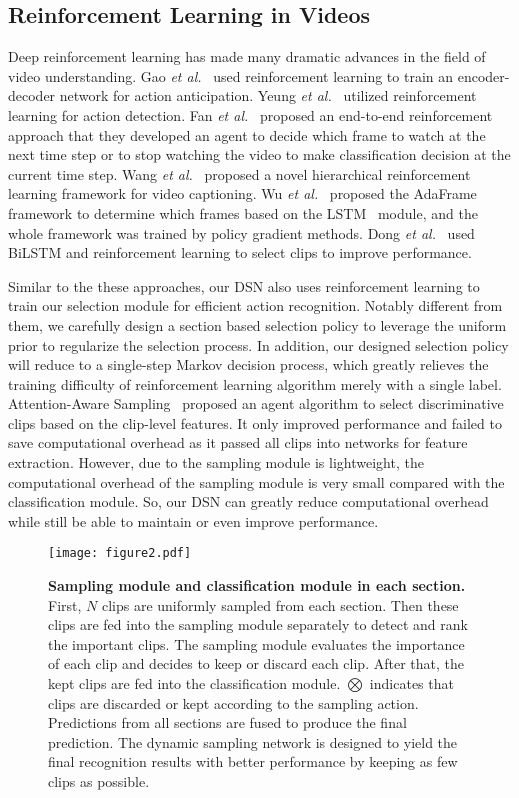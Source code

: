 \documentclass[journal]{IEEEtran}
\begin{document}
\subsection{Reinforcement Learning in Videos}
Deep reinforcement learning has made many dramatic advances in the field of video understanding.
Gao \emph{et al.}~\cite{GaoYN17a} used reinforcement learning to train an encoder-decoder network for action anticipation.
Yeung \emph{et al.}~\cite{YeungRMF16} utilized reinforcement learning for action detection.
Fan \emph{et al.}~\cite{ FanXZYGY18} proposed an end-to-end reinforcement approach that they developed an agent to decide which frame to watch at the next time step or to stop watching the video to make classification decision at the current time step.
Wang \emph{et al.}~\cite{WangCWWW18} proposed a novel hierarchical reinforcement learning framework for video captioning. Wu \emph{et al.}~\cite{AdaFrame} proposed the AdaFrame framework to determine which frames based on the LSTM~\cite{lstm} module, and the whole framework was trained by policy gradient methods.
Dong \emph{et al.}~\cite{DongZT19} used BiLSTM and reinforcement learning to select clips to improve performance.

Similar to the these approaches, our DSN also uses reinforcement learning to train our selection module for efficient action recognition.
Notably different from them, we carefully design a section based selection policy to leverage the uniform prior to regularize the selection process. In addition, our designed selection policy will reduce to a single-step Markov decision process, which greatly relieves the training difficulty of reinforcement learning algorithm merely with a single label.
Attention-Aware Sampling~\cite{DongZT19} proposed an agent algorithm to select discriminative clips based on the clip-level features. It only improved performance and failed to save computational overhead as it passed all clips into networks for feature extraction.
However, due to the sampling module is lightweight, the computational overhead of the sampling module is very small compared with the classification module. So, our DSN can greatly reduce computational overhead while still be able to maintain or even improve performance.

\begin{figure*}[t]
  \centering
  \texttt{[image: figure2.pdf]}
  \caption{\textbf{Sampling module and classification module in each section.} First, $N$ clips are uniformly sampled from each section. Then these clips are fed into the sampling module separately to detect and rank the important clips. The sampling module evaluates the importance of each clip and decides to keep or discard each clip. After that, the kept clips are fed into the classification module. $\bigotimes$ indicates that clips are discarded or kept according to the sampling action. Predictions from all sections are fused to produce the final prediction. The dynamic sampling network is designed to yield the final recognition results with better performance by keeping as few clips as possible.}
  \label{fig:arch}
\end{figure*}
\end{document}
